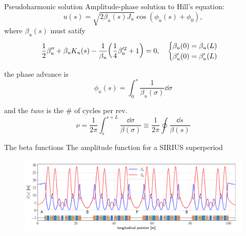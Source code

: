 \documentclass[aspectratio=169]{beamer}
\begin{document}
\begin{frame}{Pseudoharmonic solution}
Amplitude-phase solution to Hill's equation:
    \begin{equation*}
        u(s) = \sqrt{2\beta_u(s) J_u}\cos(\phi_u(s) + \phi_0),
    \end{equation*}
    \pause
    where $\beta_u(s)$ must satify
    \begin{equation*}
        \frac{1}{2}\beta_{u}^{\prime\prime}+\beta_{u} K_u(s) - \frac{1}{\beta_{u}}\qty(\frac{1}{4}\beta_{u}^{\prime 2} + 1 ) = 0, \quad
            \begin{cases}
                \beta_{u}(0) = \beta_{u}(L)\\ \beta_{u}^{\prime}(0) = \beta_{u}^{\prime}(L)
            \end{cases}
    \end{equation*}
    \pause
    \begin{minipage}{0.49\textwidth}
        the phase advance is
            \begin{equation*}
                \phi_u(s) = \int_{0}^{s}\frac{1}{\beta_u(\sigma)}\dd\sigma
            \end{equation*}
    \end{minipage}
    \hfill
    \begin{minipage}{0.49\textwidth}
        and the \textit{tune} is the \# of cycles per rev.
        \begin{equation*}
            \nu=\frac{1}{2\pi}\int_{s}^{s+L}\frac{\dd \sigma}{\beta(\sigma)}\equiv\frac{1}{2\pi}\oint\frac{\dd s}{\beta(s)}
        \end{equation*}
    \end{minipage}
\end{frame}
\begin{frame}{The beta functions}
        The amplitude function for a SIRIUS superperiod
    \begin{figure}
        \centering
        \includegraphics[width=\textwidth]{beta_functions.pdf}
    \end{figure}
\end{frame}
\end{document}

